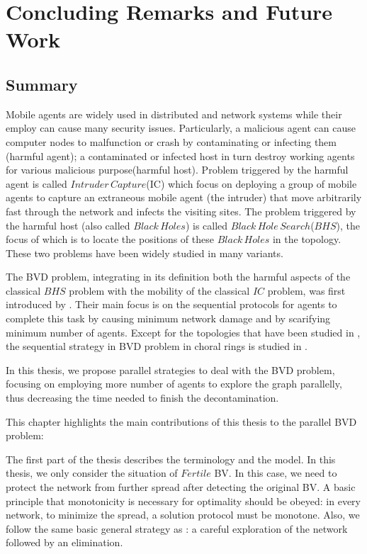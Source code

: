 \chapter {Concluding Remarks and Future Work}
\label{INTRO}

\section{Summary}
Mobile agents are widely used in distributed and network systems while their employ can cause many security issues. Particularly, a malicious agent can cause computer nodes to malfunction or crash by contaminating or infecting them (harmful agent); a contaminated or infected host in turn destroy working agents for various malicious purpose(harmful host). Problem triggered by the harmful agent is called $Intruder\,Capture$(IC) which focus on deploying a group of mobile agents to capture an extraneous mobile agent (the intruder) that move arbitrarily fast through the network and infects the visiting sites. The problem triggered by the harmful host (also called $Black\,Holes$) is called $Black\, Hole\,Search$($BHS$), the focus of which is to locate the positions of these  $Black\,Holes$ in the topology. These two problems have been widely studied in many variants.

The BVD problem, integrating in its definition both the harmful aspects of the classical $BHS$ problem with the mobility of the classical $IC$ problem, was first introduced by \cite{cai}. Their main focus is on the sequential protocols for agents to complete this task by causing minimum network damage and by scarifying minimum number of agents. Except for the topologies that have been studied in \cite{cai}, the sequential strategy in BVD problem in choral rings is studied in \cite{alotaibi}.

In this thesis, we propose parallel strategies to deal with the BVD problem, focusing on employing more number of agents to explore the graph parallelly, thus decreasing the time needed to finish the decontamination.

This chapter highlights the main contributions of this thesis to the parallel BVD problem:

The first part of the thesis describes the terminology and the model. In this thesis, we only consider the situation of $Fertile$ BV. In this case, we need to protect the network from further spread after detecting the original BV. A basic principle that monotonicity is necessary for optimality should be obeyed: in every network, to minimize the spread, a solution protocol must be monotone. Also, we follow the same basic general strategy as \cite{cai}: a careful exploration of the network followed by an elimination.

